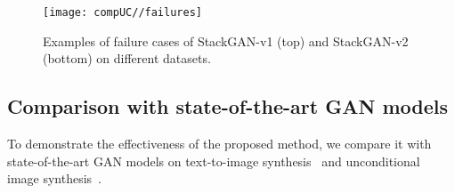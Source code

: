 \documentclass[10pt,journal,letterpaper,compsoc]{IEEEtran}
\begin{document}
\begin{figure*}[tb]
\begin{center}
\texttt{[image: compUC//failures]}
\end{center}
\vspace{-15pt}
    \caption{Examples of failure cases of StackGAN-v1 (top) and StackGAN-v2 (bottom) on different datasets.}
 \vspace{-12pt}
\label{fig:cmp_failures}
\end{figure*}





\subsection{Comparison with state-of-the-art GAN models}\label{sec:compare} 
To demonstrate the effectiveness of the proposed method, we compare it with state-of-the-art GAN models on text-to-image synthesis~\cite{reed2016generative,reed2016learning} and unconditional image synthesis~\cite{Radford15,Zhao2016,Martin17WGAN,Mao2016, GulrajaniAADC17}. 
\end{document}
